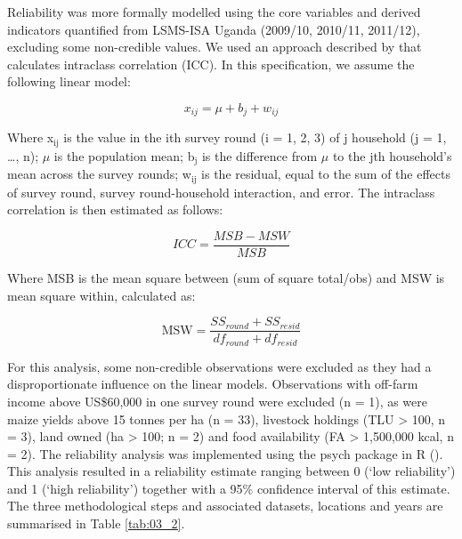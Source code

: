 Reliability was more formally modelled using the core variables and derived indicators quantified from LSMS-ISA Uganda (2009/10, 2010/11, 2011/12), excluding some non-credible values. We used an approach described by \citet{Shrout1979} that calculates intraclass correlation (ICC). In this specification, we assume the following linear model:

\begin{equation}
\tag{3.1}
x_{ij}=\mu +b_{j}+w_{ij}
\end{equation}

Where x$_{\mathrm{ij}}$ is the value in the ith survey round (i = 1, 2, 3) of j household (j = 1, {\ldots}, n); $\mu$ is the population mean; b$_{\mathrm{j}}$ is the difference from $\mu$ to the jth household's mean across the survey rounds; w$_{\mathrm{ij}}$ is the residual, equal to the sum of the effects of survey round, survey round-household interaction, and error. The intraclass correlation is then estimated as follows:

\begin{equation}
\tag{3.2}
ICC=\frac{MSB-MSW}{MSB}
\end{equation}

Where MSB is the mean square between (sum of square total/obs) and MSW is mean square within, calculated as:

\begin{equation}
\tag{3.3}
\mathrm{MSW}=\frac{SS_{round}+SS_{resid}}{df_{round}+df_{resid}}
\end{equation}

For this analysis, some non-credible observations were excluded as they had a disproportionate influence on the linear models. Observations with off-farm income above US\$60,000 in one survey round were excluded (n = 1), as were maize yields above 15 tonnes per ha (n = 33), livestock holdings (TLU {\textgreater} 100, n = 3), land owned (ha {\textgreater} 100; n = 2) and food availability (FA {\textgreater} 1,500,000 kcal, n = 2). The reliability analysis was implemented using the psych package in R (\citealp{Revelle2017}). This analysis resulted in a reliability estimate ranging between 0 (`low reliability') and 1 (`high reliability') together with a 95\% confidence interval of this estimate. The three methodological steps and associated datasets, locations and years are summarised in Table \ref{tab:03_2}.



